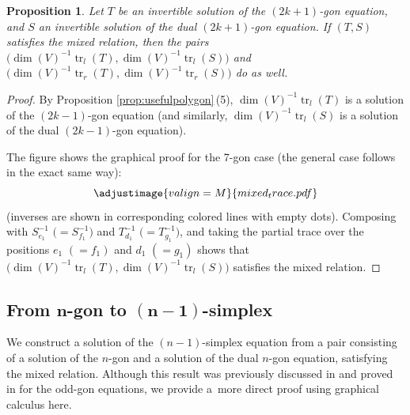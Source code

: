 \documentclass[pdftex]{sigma}
\numberwithin{equation}{section}
\newtheorem{Proposition}[Theorem]{Proposition}
\theoremstyle{definition}
\begin{document}
\begin{Proposition}
 Let $T$ be an invertible solution of the $(2k+1)$-gon equation, and $S$ an invertible solution of the dual $(2k+1)$-gon equation. If $(T,S)$ satisfies the mixed relation, then the pairs
 $\bigl(\operatorname{dim}(V)^{-1}\operatorname{tr}_l(T),\allowbreak\operatorname{dim}(V)^{-1}\operatorname{tr}_l(S)\bigr)$ and $\bigl(\operatorname{dim}(V)^{-1}\operatorname{tr}_r(T), \operatorname{dim}(V)^{-1}\operatorname{tr}_r(S)\bigr)$ do as well.
\end{Proposition}

\begin{proof}
 By Proposition \ref{prop:usefulpolygon}\,(5), $\operatorname{dim}(V)^{-1}\operatorname{tr}_l(T)$ is a solution of the $(2k-1)$-gon equation (and similarly, $\operatorname{dim}(V)^{-1}\operatorname{tr}_l(S)$ is a solution of the dual $(2k-1)$-gon equation).

 The figure shows the graphical proof for the 7-gon case (the general case follows in the exact same way):
 \begin{equation*}
 \adjustimage{valign=M}{mixed_trace.pdf}
 \end{equation*}
 (inverses are shown in corresponding colored lines with empty dots). Composing with $S_{e_1}^{-1}$ $\bigl(=S_{f_1}^{-1}\bigr)$ and $T_{d_1}^{-1}$ $\bigl(=T_{g_1}^{-1}\bigr)$, and taking the partial trace over the positions $e_1$ $(=f_1)$ and $d_1$ $(=g_1)$ shows that $\bigl(\operatorname{dim}(V)^{-1}\operatorname{tr}_l(T), \operatorname{dim}(V)^{-1}\operatorname{tr}_l(S)\bigr)$ satisfies the mixed relation.
\end{proof}

\subsection[From n-gon to (n-1)-simplex]{From $\boldsymbol{n}$-gon to $\boldsymbol{(n-1)}$-simplex}
We construct a solution of the $(n-1)$-simplex equation from a pair consisting of a solution of the $n$-gon and a solution of the dual $n$-gon equation, satisfying the mixed relation. Although this result was previously discussed in \cite{dimakis2015simplex} and proved in \cite{dimakis2021grassmannian} for the odd-gon equations, we provide a~more direct proof using graphical calculus here.
\end{document}
